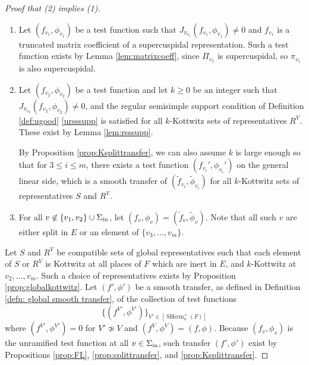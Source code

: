 \documentclass[11pt, reqno]{amsart}
\numberwithin{equation}{subsection}
\theoremstyle{plain}
\theoremstyle{definition}
\newcommand{\wt}{\widetilde}
\DeclareMathOperator{\SHerm}{SHerm}
\newcommand{\inert}{\textnormal{in}}
\begin{document}
\begin{proof}[Proof that (2) implies (1)]
\begin{enumerate}[(1)]
\item 
Let $(f_{v_1}, \phi_{v_1})$
be a test function such that
$J_{\pi_{v_1}}(f_{v_1}, \phi_{v_1}) \neq 0$ and 
$f_{v_1}$ is a truncated matrix coefficient of a 
supercuspidal representation. 
Such a test function exists
by Lemma \ref{lem:matrixcoeff}, 
since $\Pi_{v_1}$ is supercuspidal, so
$\pi_{v_1}$ is also supercuspidal.

\item \label{item:kv2} Let $(f_{v_2}, \phi_{v_2})$ be a test function
and let $k \ge 0$ be an integer such that 
$J_{\pi_{v_2}}(f_{v_2}, \phi_{v_2}) \neq 0$, and
the regular semisimple support condition of Definition
\ref{def:ugood} \eqref{ursssupp}
is satisfied for all $k$-Kottwitz 
sets of representatives $R^V$.
These exist by Lemma \ref{lem:rsssupp}.

By Proposition \ref{prop:Ksplittransfer},
we can also assume $k$ is large enough so that
for $3 \le i \le m$, there exists a test function
$(f_{v_i}', \phi_{v_i}')$ on the general linear
side, which is a smooth
transfer of $(\wt f_{v_i}, \wt \phi_{v_i})$ for all
$k$-Kottwitz sets of representatives $S$
and $R^V$.

\item For all $v \not\in \{v_1, v_2\} \cup
\Sigma_\inert$, let $(f_v, \phi_{v}) = 
(\wt f_v, \wt\phi_v)$. Note that all such $v$
are either split in $E$ or an element of
$\{v_3, \dots, v_m\}$.
\end{enumerate}

Let $S$ and $R^V$ be compatible sets of global
representatives such that each element of $S$ 
or $R^V$ is Kottwitz at all places of $F$ which
are inert in $E$, 
and $k$-Kottwitz at $v_2, \dots, v_m$.
Such a choice of representatives exists by
Proposition \ref{prop:globalkottwitz}.
Let $(f', \phi')$ be a smooth transfer, as
defined in Definition \ref{defn: global smooth transfer},
of the collection of test functions
\[
    \{(f^{V'}, \phi^{V'} )\}_{V' \in [\SHerm_n^\times(F)]}
\]
where $(f^{V'}, \phi^{V'}) = 0$ 
for $V' \not\simeq V$ and $(f^{V}, \phi^{V}) = (f, \phi)$.
Because $(f_v, \phi_{v})$ is the unramified test 
function at all $v \in \Sigma_{\inert}$, such 
transfer $(f',\phi')$ exist by
Propositions \ref{prop:FL}, \ref{prop:splittransfer}, 
and \ref{prop:Ksplittransfer}.


\end{proof}
\end{document}
